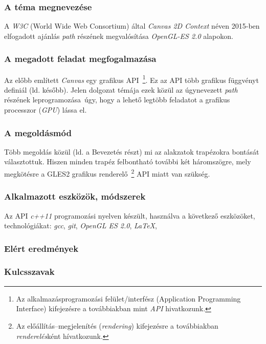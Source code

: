 \documentclass[12pt]{report}
\theoremstyle{definition}
\begin{document}
    \subsubsection*{A téma megnevezése}

  A \emph{W3C} (World Wide Web Consortium) által \emph{Canvas 2D
Context} néven 2015-ben elfogadott ajánlás \emph{path} részének
megvalósítása \emph{OpenGL-ES 2.0} alapokon.

    \subsubsection*{A megadott feladat megfogalmazása}

  Az előbb említett \emph{Canvas} egy grafikus API~\footnote{Az
alkalmazásprogramozási felület/interfész (Application Programming
Interface) kifejezésre a továbbiakban mint \emph{API}
hivatkozunk.}.
  Ez az API több grafikus függvényt definiál (ld. később).
  Jelen dolgozat témája ezek közül az úgynevezett \emph{path} részének
leprogramozása~úgy, hogy a lehető legtöbb feladatot a grafikus
processzor (\textit{GPU}) lássa el.

    \subsubsection*{A megoldásmód}

  Több megoldás közül (ld. a Bevezetés részt) mi az alakzatok trapézokra
bontását választottuk. Hiszen minden trapéz felbontható további két
háromszögre, mely megkötésre a GLES2 grafikus renderelő~\footnote{Az
előállítás--megjelenítés (\emph{rendering}) kifejezésre a
továbbiakban \emph{renderelés}ként hívatkozunk.} API miatt van
szükség.

    \subsubsection*{Alkalmazott eszközök, módszerek}

  Az API \emph{c++11} programozási nyelven készült, használva a
következő eszközöket, technológiákat: \emph{gcc}, \emph{git},
\textit{OpenGL ES 2.0}, \emph{\LaTeX},

    \subsubsection*{Elért eredmények}

    \subsubsection*{Kulcsszavak}
\end{document}
